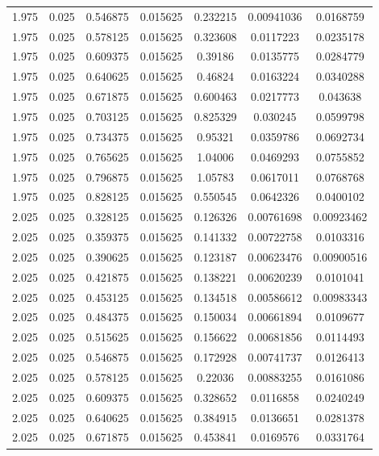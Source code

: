 \begin{table}[bh]
\begin{center}
{\begin{tabular}{ccccccc}
1.975	 & 0.025 & 	0.546875	 & 0.015625	 & 0.232215	 & 0.00941036	 & 0.0168759 \\ 
1.975	 & 0.025 & 	0.578125	 & 0.015625	 & 0.323608	 & 0.0117223	 & 0.0235178 \\ 
1.975	 & 0.025 & 	0.609375	 & 0.015625	 & 0.39186	 & 0.0135775	 & 0.0284779 \\ 
1.975	 & 0.025 & 	0.640625	 & 0.015625	 & 0.46824	 & 0.0163224	 & 0.0340288 \\ 
1.975	 & 0.025 & 	0.671875	 & 0.015625	 & 0.600463	 & 0.0217773	 & 0.043638 \\ 
1.975	 & 0.025 & 	0.703125	 & 0.015625	 & 0.825329	 & 0.030245	 & 0.0599798 \\ 
1.975	 & 0.025 & 	0.734375	 & 0.015625	 & 0.95321	 & 0.0359786	 & 0.0692734 \\ 
1.975	 & 0.025 & 	0.765625	 & 0.015625	 & 1.04006	 & 0.0469293	 & 0.0755852 \\ 
1.975	 & 0.025 & 	0.796875	 & 0.015625	 & 1.05783	 & 0.0617011	 & 0.0768768 \\ 
1.975	 & 0.025 & 	0.828125	 & 0.015625	 & 0.550545	 & 0.0642326	 & 0.0400102 \\ 
2.025	 & 0.025 & 	0.328125	 & 0.015625	 & 0.126326	 & 0.00761698	 & 0.00923462 \\ 
2.025	 & 0.025 & 	0.359375	 & 0.015625	 & 0.141332	 & 0.00722758	 & 0.0103316 \\ 
2.025	 & 0.025 & 	0.390625	 & 0.015625	 & 0.123187	 & 0.00623476	 & 0.00900516 \\ 
2.025	 & 0.025 & 	0.421875	 & 0.015625	 & 0.138221	 & 0.00620239	 & 0.0101041 \\ 
2.025	 & 0.025 & 	0.453125	 & 0.015625	 & 0.134518	 & 0.00586612	 & 0.00983343 \\ 
2.025	 & 0.025 & 	0.484375	 & 0.015625	 & 0.150034	 & 0.00661894	 & 0.0109677 \\ 
2.025	 & 0.025 & 	0.515625	 & 0.015625	 & 0.156622	 & 0.00681856	 & 0.0114493 \\ 
2.025	 & 0.025 & 	0.546875	 & 0.015625	 & 0.172928	 & 0.00741737	 & 0.0126413 \\ 
2.025	 & 0.025 & 	0.578125	 & 0.015625	 & 0.22036	 & 0.00883255	 & 0.0161086 \\ 
2.025	 & 0.025 & 	0.609375	 & 0.015625	 & 0.328652	 & 0.0116858	 & 0.0240249 \\ 
2.025	 & 0.025 & 	0.640625	 & 0.015625	 & 0.384915	 & 0.0136651	 & 0.0281378 \\ 
2.025	 & 0.025 & 	0.671875	 & 0.015625	 & 0.453841	 & 0.0169576	 & 0.0331764 \\ 

\end{tabular}}
\end{center}
\end{table}
